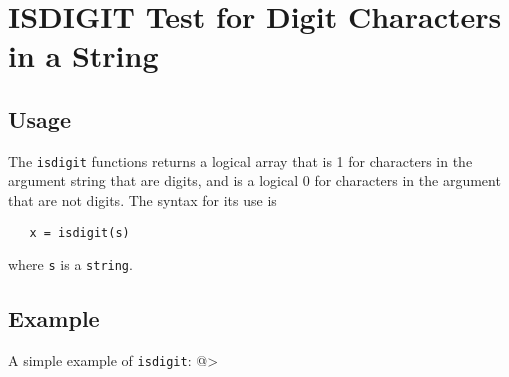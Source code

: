 \section{ISDIGIT Test for Digit Characters in a String}

\subsection{Usage}

The \verb|isdigit| functions returns a logical array that is 1 
for characters in the argument string that are digits, and 
is a logical 0 for characters in the argument that are not
digits.  The syntax for its use is
\begin{verbatim}
   x = isdigit(s)
\end{verbatim}
where \verb|s| is a \verb|string|.  
\subsection{Example}

A simple example of \verb|isdigit|:
@>
